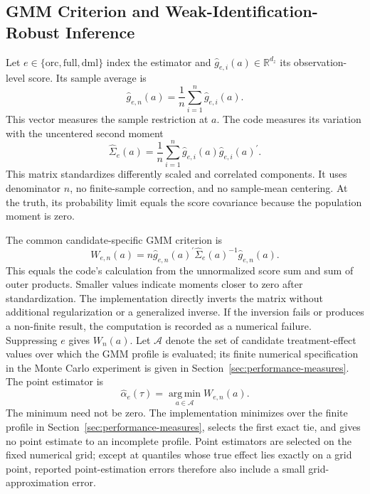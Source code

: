 \subsection{GMM Criterion and Weak-Identification-Robust Inference}

Let $e\in\{\mathrm{orc},\mathrm{full},\mathrm{dml}\}$ index the estimator and $\widehat g_{e,i}(a)\in\mathbb{R}^{d_z}$ its observation-level score. Its sample average is
\begin{equation}
    \widehat g_{e,n}(a)
    =
    \frac{1}{n}\sum_{i=1}^{n}\widehat g_{e,i}(a).
    \label{eq:sample-gmm-moment}
\end{equation}
This vector measures the sample restriction at $a$. The code measures its variation with the uncentered second moment
\begin{equation}
    \widehat\Sigma_e(a)
    =
    \frac{1}{n}\sum_{i=1}^{n}
    \widehat g_{e,i}(a)\widehat g_{e,i}(a)^{\prime}.
    \label{eq:score-covariance}
\end{equation}
This matrix standardizes differently scaled and correlated components. It uses denominator $n$, no finite-sample correction, and no sample-mean centering. At the truth, its probability limit equals the score covariance because the population moment is zero.

The common candidate-specific GMM criterion is
\begin{equation}
    W_{e,n}(a)
    =
    n\widehat g_{e,n}(a)^{\prime}
    \widehat\Sigma_e(a)^{-1}
    \widehat g_{e,n}(a).
    \label{eq:gmm-criterion}
\end{equation}
This equals the code's calculation from the unnormalized score sum and sum of outer products. Smaller values indicate moments closer to zero after standardization. The implementation directly inverts the matrix without additional regularization or a generalized inverse. If the inversion fails or produces a non-finite result, the computation is recorded as a numerical failure. Suppressing $e$ gives $W_n(a)$. Let $\mathcal A$ denote the set of candidate treatment-effect values over which the GMM profile is evaluated; its finite numerical specification in the Monte Carlo experiment is given in Section~\ref{sec:performance-measures}. The point estimator is
\begin{equation}
    \widehat\alpha_e(\tau)
    =
    \operatorname*{arg\,min}_{a\in\mathcal A}W_{e,n}(a).
    \label{eq:gmm-point-estimator}
\end{equation}
The minimum need not be zero. The implementation minimizes over the finite profile in Section~\ref{sec:performance-measures}, selects the first exact tie, and gives no point estimate to an incomplete profile. Point estimators are selected on the fixed numerical grid; except at quantiles whose true effect lies exactly on a grid point, reported point-estimation errors therefore also include a small grid-approximation error.

